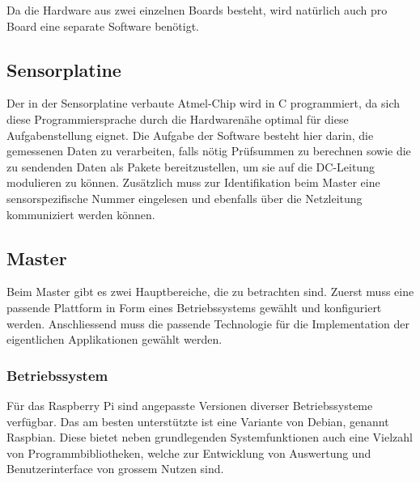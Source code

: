 Da die Hardware  aus zwei einzelnen Boards besteht, wird  nat\"urlich auch pro
Board eine separate Software ben\"otigt.

\subsection{Sensorplatine}

Der  in der  Sensorplatine  verbaute  Atmel-Chip wird  in  C programmiert,  da
sich  diese Programmiersprache  durch die  Hardwaren\"ahe optimal  f\"ur diese
Aufgabenstellung  eignet. Die Aufgabe  der  Software besteht  hier darin,  die
gemessenen Daten zu verarbeiten, falls n\"otig Pr\"ufsummen zu berechnen sowie
die zu sendenden  Daten als Pakete bereitzustellen, um sie  auf die DC-Leitung
modulieren zu k\"onnen. Zus\"atzlich muss  zur Identifikation beim Master eine
sensorspezifische  Nummer  eingelesen  und ebenfalls  \"uber  die  Netzleitung
kommuniziert werden k\"onnen.

\subsection{Master}

Beim  Master gibt  es  zwei  Hauptbereiche, die  zu  betrachten sind.   Zuerst
muss  eine passende  Plattform  in Form  eines  Betriebssystems gew\"ahlt  und
konfiguriert werden.   Anschliessend muss  die passende Technologie  f\"ur die
Implementation der eigentlichen Applikationen gew\"ahlt werden.


\subsubsection{Betriebssystem}

F\"ur  das Raspberry  Pi  sind angepasste  Versionen diverser  Betriebssysteme
verf\"ugbar. Das  am  besten  unterst\"utzte  ist eine  Variante  von  Debian,
genannt Raspbian. Diese bietet neben  grundlegenden Systemfunktionen auch eine
Vielzahl von  Programmbibliotheken, welche zur Entwicklung  von Auswertung und
Benutzerinterface von grossem Nutzen sind.

